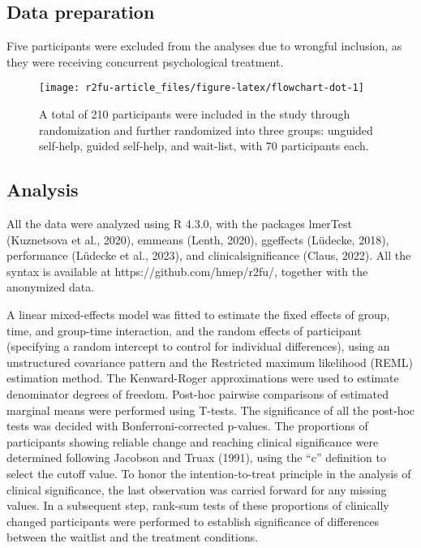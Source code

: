\documentclass[3p]{elsarticle} %
\begin{document}
\hypertarget{data-preparation}{%
\subsection{Data preparation}\label{data-preparation}}

Five participants were excluded from the analyses due to wrongful
inclusion, as they were receiving concurrent psychological treatment.

\begin{figure}
\texttt{[image: r2fu-article\_files/figure-latex/flowchart-dot-1]} \caption{A total of 210 participants were included in the study through randomization and further randomized into three groups: unguided self-help, guided self-help, and wait-list, with 70 participants each.}\label{fig:flowchart-dot}
\end{figure}

\hypertarget{analysis}{%
\subsection{Analysis}\label{analysis}}

All the data were analyzed using R 4.3.0, with the packages lmerTest
(Kuznetsova et al., 2020), emmeans (Lenth, 2020), ggeffects (Lüdecke,
2018), performance (Lüdecke et al., 2023), and clinicalsignificance
(Claus, 2022). All the syntax is available at
https://github.com/hmep/r2fu/, together with the anonymized data.

A linear mixed-effects model was fitted to estimate the fixed effects of
group, time, and group-time interaction, and the random effects of
participant (specifying a random intercept to control for individual
differences), using an unstructured covariance pattern and the
Restricted maximum likelihood (REML) estimation method. The
Kenward-Roger approximations were used to estimate denominator degrees
of freedom. Post-hoc pairwise comparisons of estimated marginal means
were performed using T-tests. The significance of all the post-hoc tests
was decided with Bonferroni-corrected p-values. The proportions of
participants showing reliable change and reaching clinical significance
were determined following Jacobson and Truax (1991), using the ``c''
definition to select the cutoff value. To honor the intention-to-treat
principle in the analysis of clinical significance, the last observation
was carried forward for any missing values. \color{newtext}In a
subsequent step, rank-sum tests of these proportions of clinically
changed participants were performed to establish significance of
differences between the waitlist and the treatment
conditions.\color{oldtext}
\end{document}
